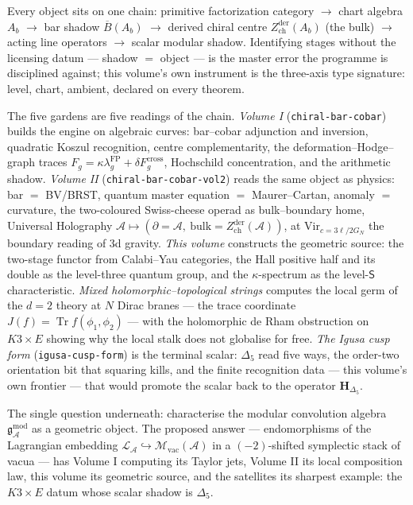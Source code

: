 \documentclass[11pt]{article}
\providecommand{\cA}{\mathcal{A}}
\providecommand{\cL}{\mathcal{L}}
\providecommand{\cM}{\mathcal{M}}
\providecommand{\fg}{\mathfrak{g}}
\providecommand{\barB}{\overline{B}}
\providecommand{\Vir}{\mathrm{Vir}}
\providecommand{\Zder}{Z^{\mathrm{der}}_{\mathrm{ch}}}
\providecommand{\Dfive}{\Delta_5}
\providecommand{\Tr}{\operatorname{Tr}}
\begin{document}
Every object sits on one chain: primitive factorization category
$\to$ chart algebra $A_b$ $\to$ bar shadow $\barB(A_b)$ $\to$ derived
chiral centre $\Zder(A_b)$ \textup{(the bulk)} $\to$ acting line
operators $\to$ scalar modular shadow. Identifying stages without the
licensing datum --- shadow $=$ object --- is the master error the
programme is disciplined against; this volume's own instrument is the
three-axis type signature: level, chart, ambient, declared on every
theorem.

The five gardens are five readings of the chain. \emph{Volume I}
(\texttt{chiral-bar-cobar}) builds the engine on algebraic curves:
bar--cobar adjunction and inversion, quadratic Koszul recognition,
centre complementarity, the deformation--Hodge--graph traces
$F_g=\kappa\lambda^{\mathrm{FP}}_g+\delta F^{\mathrm{cross}}_g$,
Hochschild concentration, and the arithmetic shadow. \emph{Volume II}
(\texttt{chiral-bar-cobar-vol2}) reads the same object as physics:
bar $=$ BV/BRST, quantum master equation $=$ Maurer--Cartan, anomaly
$=$ curvature, the two-coloured Swiss-cheese operad as bulk--boundary
home, Universal Holography
$\cA\mapsto(\partial=\cA,\ \mathrm{bulk}=\Zder(\cA))$, at
$\Vir_{c=3\ell/2G_N}$ the boundary reading of 3d gravity.
\emph{This volume} constructs the geometric source: the two-stage
functor from Calabi--Yau categories, the Hall positive half and its
double as the level-three quantum group, and the $\kappa$-spectrum as
the level-$\mathsf S$ characteristic. \emph{Mixed
holomorphic--topological strings} computes the local germ of the
$d=2$ theory at $N$ Dirac branes --- the trace coordinate
$J(f)=\Tr f(\phi_1,\phi_2)$ --- with the holomorphic de Rham
obstruction on $K3\times E$ showing why the local stalk does not
globalise for free. \emph{The Igusa cusp form}
(\texttt{igusa-cusp-form}) is the terminal scalar: $\Dfive$ read five
ways, the order-two orientation bit that squaring kills, and the
finite recognition data --- this volume's own frontier --- that would
promote the scalar back to the operator $\mathbf H_{\Dfive}$.

The single question underneath: characterise the modular convolution
algebra $\fg^{\mathrm{mod}}_\cA$ as a geometric object. The proposed
answer --- endomorphisms of the Lagrangian embedding
$\cL_\cA\hookrightarrow\cM_{\mathrm{vac}}(\cA)$ in a $(-2)$-shifted
symplectic stack of vacua --- has Volume I computing its Taylor jets,
Volume II its local composition law, this volume its geometric
source, and the satellites its sharpest example: the $K3\times E$
datum whose scalar shadow is $\Dfive$.
\end{document}

